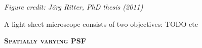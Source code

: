 \documentclass[a0paper,portrait,fontscale=0.35]{baposter}
\newcommand{\mycaption}[1]{
  {
    \smaller
    \emph{#1}
  }
}
\theoremstyle{plain}
\theoremstyle{plain}
\theoremstyle{definition}
\theoremstyle{plain}
\theoremstyle{definition}
\begin{document}
\begin{poster}
{\begin{minipage}[t]{\textwidth}
\begin{minipage}[t]{0.48\textwidth}
      \begin{minipage}[t]{\textwidth}
        \centering
       
        \mycaption{Figure credit: J\"{o}rg Ritter, PhD thesis (2011)}
      \end{minipage}
     

      \hspace{1em}
      
      A light-sheet microscope consists of two objectives: TODO etc
    
    \end{minipage}
    \begin{minipage}[t]{0.48\textwidth}
      \begin{center}
        \larger
        {\color{blue}\textbf{\textsc{Spatially varying PSF}}}\\
      \end{center}
      

\end{minipage}
\end{minipage}}
\end{poster}
\end{document}
